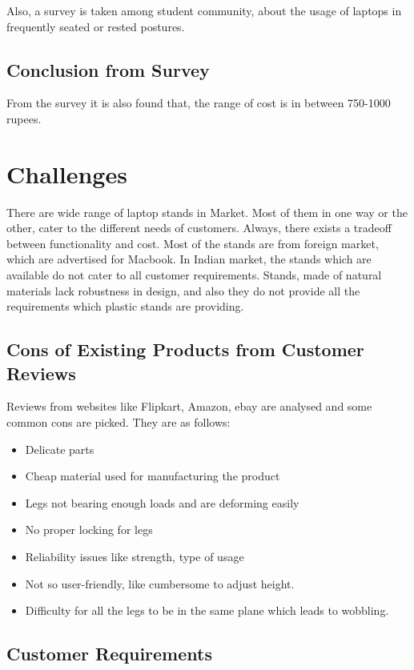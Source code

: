 Also, a survey is taken among student community, about the usage of laptops in frequently seated or rested postures. 


\section{Conclusion from Survey}

From the survey it is also found that, the range of cost is in between 750-1000 rupees.

\chapter{Challenges}

There are wide range of  laptop stands in Market. Most of them in one way or the other, cater to the different needs of customers. Always, there exists a tradeoff between functionality and cost. Most of the stands are from foreign market, which are advertised for Macbook. In Indian market, the stands which are available do not cater to all customer requirements. Stands, made of natural materials lack robustness in design, and also they do not provide all the requirements which plastic stands are providing.  


\section{Cons of Existing Products from Customer Reviews}

Reviews from websites like Flipkart, Amazon, ebay are analysed and some common cons are picked. They are as follows:\cite{amazon_site}

\begin{itemize}
 \item Delicate parts
 \item Cheap material used for manufacturing the product
 \item Legs not bearing enough loads and are deforming easily
 \item No proper locking for legs
 \item Reliability issues like strength, type of usage
 \item Not so user-friendly, like cumbersome to adjust height.
 \item Difficulty for all the legs to be in the same plane which leads to wobbling.
 \end{itemize}
 
 \section{Customer Requirements}
 
